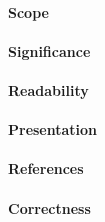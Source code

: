 \documentclass{jhps}
\begin{document}
\paragraph{Scope} %

\paragraph{Significance} %

\paragraph{Readability} %

\paragraph{Presentation}

\paragraph{References} %

\paragraph{Correctness} %
\end{document}
